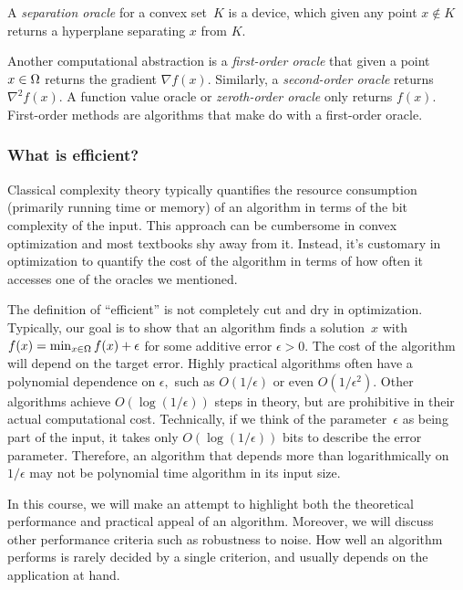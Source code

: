 \begin{definition}
A \emph{separation oracle} for a convex set~$K$ is a device, which given any point $x\not\in K$ returns a hyperplane separating $x$ from $K.$
\end{definition}

Another computational abstraction is a \emph{first-order oracle} that given a point $x\in\Omega$ returns the gradient $\nabla f(x).$ Similarly, a \emph{second-order oracle} returns $\nabla^2 f(x).$ A function value oracle or \emph{zeroth-order oracle} only returns $f(x).$
First-order methods are algorithms that make do with a first-order oracle.

\subsubsection{What is efficient?}
Classical complexity theory typically quantifies the resource consumption (primarily running time or memory) of an algorithm in terms of the bit complexity of the input. 
This approach can be cumbersome in convex optimization and most textbooks shy away from it. 
Instead, it's customary in optimization to quantify the cost of the algorithm in terms of how often it accesses one of the oracles we mentioned.

The definition of ``efficient'' is not completely cut and dry in optimization. 
Typically, our goal is to show that an algorithm finds a solution~$x$ with $f(x) = \min_{x\in\Omega}f(x) + \epsilon$ for some additive error $\epsilon>0.$ 
The cost of the algorithm will depend on the target error. 
Highly practical algorithms often have a polynomial dependence on $\epsilon,$ such as $O(1/\epsilon)$ or even $O(1/\epsilon^2).$ Other algorithms achieve $O(\log(1/\epsilon))$ steps in theory, but are prohibitive in their actual computational cost. Technically, if we think of the parameter~$\epsilon$ as being part of the input, it takes only $O(\log(1/\epsilon))$ bits to describe the error parameter. Therefore, an algorithm that depends more than logarithmically on $1/\epsilon$ may not be polynomial time algorithm in its input size.

In this course, we will make an attempt to highlight both the theoretical performance and practical appeal of an algorithm. Moreover, we will discuss other performance criteria such as robustness to noise. How well an algorithm performs is rarely decided by a single criterion, and usually depends on the application at hand.
